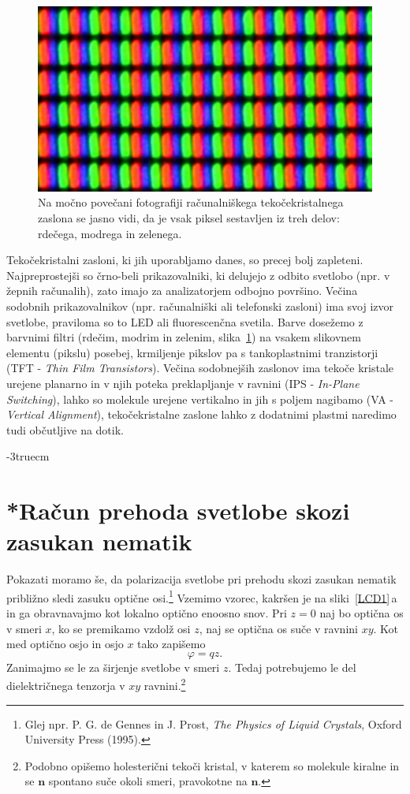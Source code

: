 \begin{figure}[ht]
\centering
\includegraphics[width=80truemm]{slike/09_LCD.jpg}
\caption{Na močno povečani fotografiji računalniškega tekočekristalnega zaslona se 
jasno vidi, da je vsak piksel sestavljen iz treh delov: rdečega, modrega in zelenega.}
\label{fig:LCD}
\end{figure}
\begin{remark}
Tekočekristalni zasloni, ki jih uporabljamo danes, so precej bolj zapleteni.
Najpreprostejši so črno-beli prikazovalniki, ki delujejo z odbito svetlobo (npr. 
v žepnih računalih), zato imajo za analizatorjem odbojno površino. Večina 
sodobnih prikazovalnikov (npr. računalniški ali telefonski zasloni) ima svoj izvor svetlobe, 
praviloma so to LED ali fluorescenčna svetila.
Barve dosežemo z barvnimi filtri (rdečim, modrim in zelenim, slika~\ref{fig:LCD}) na vsakem 
slikovnem elementu (pikslu) posebej, krmiljenje pikslov pa s tankoplastnimi 
tranzistorji (TFT - {\it Thin Film Transistors}). Večina
sodobnejših zaslonov ima tekoče kristale urejene planarno in v njih poteka
preklapljanje v ravnini (IPS - {\it In-Plane Switching}), lahko so molekule
urejene vertikalno in jih s poljem nagibamo (VA - {\it Vertical Alignment}), tekočekristalne 
zaslone lahko z dodatnimi plastmi naredimo tudi občutljive na dotik.
\end{remark}
\vglue-3truecm
\section{*Račun prehoda svetlobe skozi zasukan nematik}
Pokazati moramo še, da polarizacija svetlobe pri prehodu skozi zasukan nematik 
približno sledi zasuku optične osi.\footnote{Glej npr. P. G. de Gennes in J. Prost, 
{\it The Physics of Liquid Crystals}, Oxford University Press (1995).}
Vzemimo vzorec, kakršen je na sliki~\ref{LCD1}\,a in ga obravnavajmo
kot lokalno optično enoosno snov. Pri $z=0$ naj bo optična
os v smeri $x$, ko se premikamo vzdolž osi $z$, naj se optična os suče
v ravnini $xy$. Kot med optično osjo in osjo $x$ tako zapišemo 
\begin{equation}
\varphi=qz.
\label{7.58}
\end{equation}
Zanimajmo se le za širjenje svetlobe v smeri $z$. 
Tedaj potrebujemo le del dielektričnega
tenzorja v $xy$ ravnini.\footnote{Podobno opišemo holesterični tekoči kristal, v
katerem so molekule kiralne in se $\mathbf{n}$ spontano suče okoli
smeri, pravokotne na $\mathbf{n}$.} 

